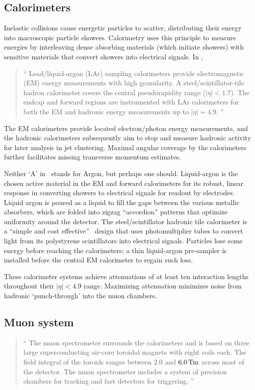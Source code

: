 \subsection{Calorimeters}
\label{sec:atlas_calo}
Inelastic collisions cause energetic particles to scatter, distributing their
energy into macroscopic particle showers.
Calorimetry uses this principle to measure energies
by interleaving dense absorbing materials (which initiate showers)
with sensitive materials that convert showers into electrical signals.
In \atlas,
\begin{quote}
``%
Lead/liquid-argon (LAr) sampling calorimeters provide electromagnetic (EM)
energy measurements with high granularity.
A steel/scintillator-tile hadron calorimeter covers the central pseudorapidity
range ($|\eta| < 1.7$).
The endcap and forward regions are instrumented with LAr calorimeters for both
the EM and hadronic energy measurements up to $|\eta| = 4.9$.%
''~\cite{atlas2022searches}
\end{quote}
The EM calorimeters provide located electron/photon energy measurements,
and the hadronic calorimeters subsequently aim to stop and measure hadronic
activity for later analysis in jet clustering.
Maximal angular coverage by the calorimeters further facilitates missing
transverse momentum estimates.

Neither `A' in \atlas\ stands for Argon, but perhaps one should.
Liquid-argon is the chosen active material in the EM and forward calorimeters
for its robust, linear response in converting showers to electrical signals
for readout by electrodes.
Liquid argon is poured as a liquid to fill the gaps between the various
metallic absorbers, which are folded into zigzag ``accordion'' patterns that
optimize uniformity around the detector.
The steel/scintillator hadronic tile calorimeter is a
``simple and cost effective''~\cite{atlas1996tile} design that uses
photomultiplier tubes to convert light from its polystyrene scintillators into
electrical signals.
Particles lose some energy before reaching the calorimeters; a thin
liquid-argon pre-sampler is installed before the central EM calorimeter
to regain such loss.

These calorimeter systems achieve attenuations of at least ten interaction
lengths throughout their $|\eta| < 4.9$ range.
Maximizing attenuation minimizes noise from hadronic `punch-through' into the
muon chambers.


\subsection{Muon system}
\label{sec:atlas_muon}
\begin{quote}
``%
The muon spectrometer surrounds the calorimeters and is based on three large
superconducting air-core toroidal magnets with eight coils each.
The field integral of the toroids ranges between $2.0$ and
$6.0\,\mathrm{T\kern-0.15ex m}$ across most of the detector.
The muon spectrometer includes a system of precision chambers for tracking and
fast detectors for triggering.%
''~\cite{atlas2022searches}
\end{quote}



